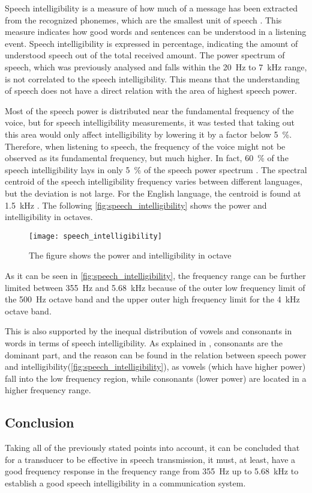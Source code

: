 Speech intelligibility is a measure of how much of a message has been extracted from the recognized phonemes, which are the smallest unit of speech \citep{arl_us_army}. This measure indicates how good words and sentences can be understood in a listening event. Speech intelligibility  is expressed in percentage, indicating the amount of understood speech out of the total received amount. The power spectrum of speech, which was previously analysed and falls within the \SI{20}{\hertz} to \SI{7}{\kilo\hertz} range, is not correlated to the speech intelligibility. This means that the understanding of speech does not have a direct relation with the area of highest speech power. 

Most of the speech power is distributed near the fundamental frequency of the voice, but for speech intelligibility measurements, it was tested that taking out this area would only affect intelligibility by lowering it by a factor below \SI{5}{\percent}. Therefore, when listening to speech, the frequency of the voice might not be observed as its fundamental frequency, but much higher. In fact, \SI{60}{\percent} of the speech intelligibility lays in only \SI{5}{\percent} of the speech power spectrum \citep{arl_us_army}. The spectral centroid of the speech intelligibility frequency varies between different languages, but the deviation is not large. For the English language, the centroid is found at \SI{1.5}{\kilo\hertz} \citep{arl_us_army}. The following \autoref{fig:speech_intelligibility} shows the power and intelligibility in octaves. 

 \begin{figure}[H]
	\centering
		\texttt{[image: speech\_intelligibility]}
		\caption{The figure shows the power and intelligibility in octave  \citep{arl_us_army}}
		\label{fig:speech_intelligibility}
\end{figure}

As it can be seen in \autoref{fig:speech_intelligibility}, the frequency range can be further limited between \SI{355}{\hertz} and \SI{5.68}{\kilo\hertz} because of the outer low frequency limit of the \SI{500}{\hertz} octave band and the upper outer high frequency limit for the \SI{4}{\kilo\hertz} octave band. 

This is also supported by the inequal distribution of vowels and consonants in words in terms of speech intelligibility. As explained in \citep{arl_us_army}, consonants are the dominant part, and the reason can be found in the relation between speech power and intelligibility(\autoref{fig:speech_intelligibility}), as vowels (which have higher power) fall into the low frequency region, while consonants (lower power) are located in a higher frequency range.

\subsection{Conclusion}
Taking all of the previously stated points into account, it can be concluded that for a transducer to be effective in speech transmission, it must, at least, have a good frequency response in the frequency range from \SI{355}{\hertz} up to \SI{5.68}{\kilo\hertz} to establish a good speech intelligibility in a communication system.

